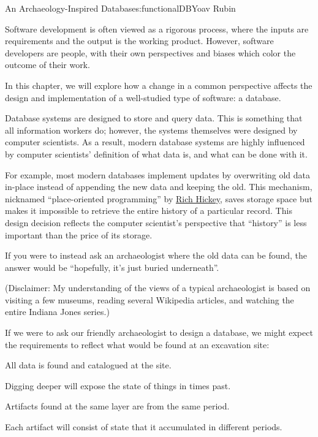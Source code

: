 \begin{aosachapter}{An Archaeology-Inspired Database}{s:functionalDB}{Yoav Rubin}

Software development is often viewed as a rigorous process, where the
inputs are requirements and the output is the working product. However,
software developers are people, with their own perspectives and biases
which color the outcome of their work.

In this chapter, we will explore how a change in a common perspective
affects the design and implementation of a well-studied type of
software: a database.

\label{introduction}

Database systems are designed to store and query data. This is something
that all information workers do; however, the systems themselves were
designed by computer scientists. As a result, modern database systems
are highly influenced by computer scientists' definition of what data
is, and what can be done with it.

For example, most modern databases implement updates by overwriting old
data in-place instead of appending the new data and keeping the old.
This mechanism, nicknamed ``place-oriented programming'' by
\href{http://www.infoq.com/presentations/Value-Values}{Rich Hickey},
saves storage space but makes it impossible to retrieve the entire
history of a particular record. This design decision reflects the
computer scientist's perspective that ``history'' is less important than
the price of its storage.

If you were to instead ask an archaeologist where the old data can be
found, the answer would be ``hopefully, it's just buried underneath''.

(Disclaimer: My understanding of the views of a typical archaeologist is
based on visiting a few museums, reading several Wikipedia articles, and
watching the entire Indiana Jones series.)

\label{designing-a-database-like-an-archaeologist}

If we were to ask our friendly archaeologist to design a database, we
might expect the requirements to reflect what would be found at an
excavation site:

\begin{aosaitemize}

\item
  All data is found and catalogued at the site.
\item
  Digging deeper will expose the state of things in times past.
\item
  Artifacts found at the same layer are from the same period.
\item
  Each artifact will consist of state that it accumulated in different
  periods.
\end{aosaitemize}


\end{aosachapter}
